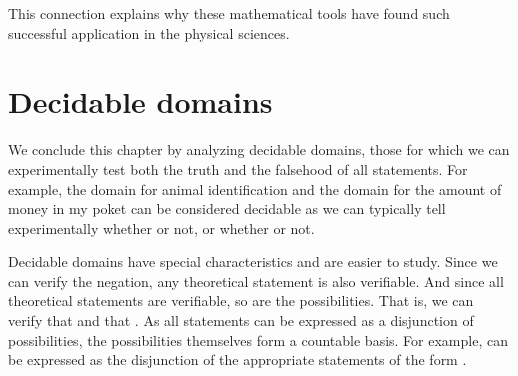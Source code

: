 \documentclass[11pt,letterpaper,fleqn]{memoir} %
\begin{document}
This connection explains why these mathematical tools have found such successful application in the physical sciences.

\section{Decidable domains}

We conclude this chapter by analyzing decidable domains, those for which we can experimentally test both the truth and the falsehood of all statements. For example, the domain for animal identification and the domain for the amount of money in my poket can be considered decidable as we can typically tell experimentally whether  or not, or whether  or not.

Decidable domains have special characteristics and are easier to study. Since we can verify the negation, any theoretical statement is also verifiable. And since all theoretical statements are verifiable, so are the possibilities. That is, we can verify that  and that . As all statements can be expressed as a disjunction of possibilities, the possibilities themselves form a countable basis. For example,  can be expressed as the disjunction of the appropriate statements of the form .
\end{document}
